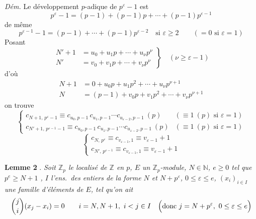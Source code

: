 \documentclass[11pt,a4paper]{article}
\begin{document}
\emph{Dém.} Le développement $p$-adique de $p^\varepsilon - 1$ est
\[ p^\varepsilon - 1 = (p-1) + (p-1)p + \cdots + (p-1)p^{\varepsilon-1} \]
de même
\[ p^{\varepsilon-1} - 1 = (p-1) + \cdots + (p-1)p^{\varepsilon-2} \quad \text{si } \varepsilon \geq 2 \qquad (= 0 \text{ si } \varepsilon = 1) \]
Posant
\[ \left.\begin{aligned} N'+1 &= u_0 + u_1 p + \cdots + u_\nu p^\nu \\ N' &= v_0 + v_1 p + \cdots + v_\nu p^\nu \end{aligned}\right\} \quad (\nu \geq \varepsilon - 1) \]
d'où
\[ \begin{aligned} N+1 &= 0 + u_0 p + u_1 p^2 + \cdots + u_\nu p^{\nu+1} \\ N &= (p-1) + v_0 p + v_1 p^2 + \cdots + v_\nu p^{\nu+1} \end{aligned} \]
on trouve
\[ \begin{cases} c_{N+1,\, p^\varepsilon - 1} \equiv c_{u_0, p-1}\, c_{u_1, p-1} \cdots c_{u_{\varepsilon-2}, p-1} \ (p) & (\equiv 1 \ (p) \text{ si } \varepsilon = 1) \\ c_{N'+1,\, p^{\varepsilon-1} - 1} \equiv c_{u_0, p-1}\, c_{u_1, p-1} \cdots c_{u_{\varepsilon-2}, p-1} \ (p) & (\equiv 1 \ (p) \text{ si } \varepsilon = 1) \end{cases} \]
\[ \begin{cases} c_{N,\, p^\varepsilon} \equiv c_{v_{\varepsilon-1}, 1} \equiv v_{\varepsilon-1} + 1 \\ c_{N',\, p^{\varepsilon-1}} \equiv c_{v_{\varepsilon-1}, 1} \equiv v_{\varepsilon-1} + 1 \end{cases} \]

\textbf{Lemme 2} \struck{\ill{}}. \emph{Soit $\mathbb{Z}_p$ le localisé de $\mathbb{Z}$ en $p$, $E$ un $\mathbb{Z}_p$-module, $N \in \mathbb{N}$, $e \geq 0$ tel que $p^e \geq N + 1$ \struck{\ill{}}, $I$ l'ens.\ des entiers de la forme $N$ et $N + p^\varepsilon$, $0 \leq \varepsilon \leq e$, $(x_i)_{i \in I}$ une famille d'éléments de $E$, tel qu'on ait
\[ \binom{j}{i}(x_j - x_i) = 0 \qquad i = N, N+1,\ i < j \in I \quad \Bigl(\text{donc } j = N + p^\varepsilon,\ 0 \leq \varepsilon \leq e\Bigr) \]}
\end{document}
